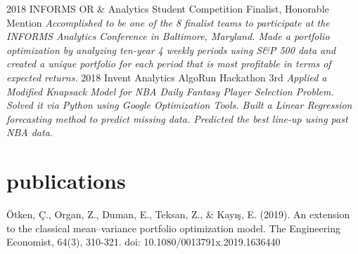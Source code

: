 \documentclass[]{zbatuhan-cv}
\begin{document}
\begin{entrylist}
  \entry
    {2018}
    {INFORMS OR \& Analytics Student Competition}
    {Finalist, Honorable Mention}
    {\emph{\small Accomplished to be one of the 8 finalist teams to participate at the INFORMS Analytics Conference in Baltimore, Maryland. Made a portfolio optimization by analyzing ten-year 4 weekly periods using S\&P 500 data and created a unique portfolio for each period that is most profitable in terms of expected returns.}}
  \entry
    {2018}
    {Invent Analytics AlgoRun Hackathon}
    {3rd}
    {\emph{\small Applied a Modified Knapsack Model for NBA Daily Fantasy Player Selection Problem. Solved it via Python using Google Optimization Tools.
    Built a Linear Regression forecasting method to predict missing data.
    Predicted the best line-up using past NBA data.}}
\end{entrylist}

\vspace{-0.35cm}


\vspace{-0.20 cm}

\section{publications}

\begin{refsection}[1]
   \nocite{*}
   Ötken, Ç., Organ, Z., Duman, E., Teksan, Z., \& Kayış, E. (2019). An extension to the classical mean–variance portfolio optimization model. The Engineering Economist, 64(3), 310-321. doi: 10.1080/0013791x.2019.1636440
\end{refsection}
\end{document}
